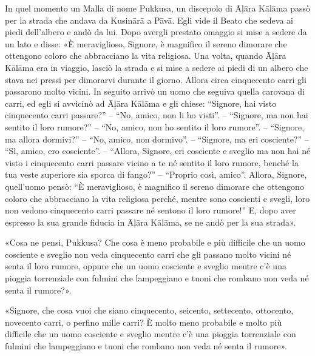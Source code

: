 
In quel momento un Malla di nome Pukkusa, un discepolo di Āḷāra Kālāma passò per
la strada che andava da Kusinārā a Pāvā. Egli vide il Beato che sedeva ai piedi
dell’albero e andò da lui. Dopo avergli prestato omaggio si mise a sedere da un
lato e disse: «È meraviglioso, Signore, è magnifico il sereno dimorare che
ottengono coloro che abbracciano la vita religiosa. Una volta, quando Āḷāra
Kālāma era in viaggio, lasciò la strada e si mise a sedere ai piedi di un albero
che stava nei pressi per dimorarvi durante il giorno. Allora circa cinquecento
carri gli passarono molto vicini. In seguito arrivò un uomo che seguiva quella
carovana di carri, ed egli si avvicinò ad Āḷāra Kālāma e gli chiese: “Signore,
hai visto cinquecento carri passare?” – “No, amico, non li ho visti”. –
“Signore, ma non hai sentito il loro rumore?” – “No, amico, non ho sentito il
loro rumore”. – “Signore, ma allora dormivi?” – “No, amico, non dormivo”. –
“Signore, ma eri cosciente?” – “Sì, amico, ero cosciente”. – “Allora, Signore,
eri cosciente e sveglio ma non hai né visto i cinquecento carri passare vicino a
te né sentito il loro rumore, benché la tua veste superiore sia sporca di
fango?” – “Proprio così, amico”. Allora, Signore, quell’uomo pensò: “È
meraviglioso, è magnifico il sereno dimorare che ottengono coloro che
abbracciano la vita religiosa perché, mentre sono coscienti e svegli, loro non
vedono cinquecento carri passare né sentono il loro rumore!” E, dopo aver
espresso la sua grande fiducia in Āḷāra Kālāma, se ne andò per la sua strada».

«Cosa ne pensi, Pukkusa? Che cosa è meno probabile e più difficile che un uomo
cosciente e sveglio non veda cinquecento carri che gli passano molto vicini né
senta il loro rumore, oppure che un uomo cosciente e sveglio mentre c’è una
pioggia torrenziale con fulmini che lampeggiano e tuoni che rombano non veda né
senta il rumore?».

«Signore, che cosa vuoi che siano cinquecento, seicento, settecento, ottocento,
novecento carri, o perfino mille carri? È molto meno probabile e molto più
difficile che un uomo cosciente e sveglio mentre c’è una pioggia torrenziale con
fulmini che lampeggiano e tuoni che rombano non veda né senta il rumore».

